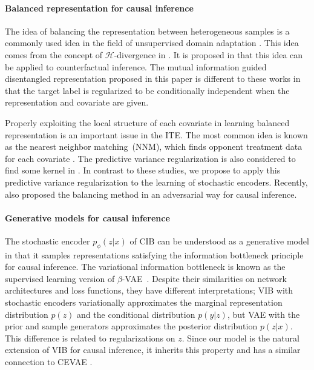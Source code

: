 \documentclass{article}
\begin{document}
\paragraph{Balanced representation for causal inference}

The idea of balancing the representation between heterogeneous samples is a commonly used idea in the field of unsupervised domain adaptation \cite{UDA15, tzeng2017adversarial, hoffman18}. This idea comes from the concept of $ \mathcal{H}$-divergence in \cite{ben2010theory}. It is proposed in \cite{johansson16, Shalit17} that this idea can be applied to counterfactual inference. The mutual information guided disentangled representation proposed in this paper is different to these works in that the target label is regularized to be conditionally independent when the representation and covariate are given.
    
Properly exploiting the local structure of each covariate in learning balanced representation is an important issue in the ITE. The most common idea is known as the nearest neighbor matching~(NNM), which finds opponent treatment data for each covariate \cite{johansson16,li2017matching,yao2018}. The predictive variance regularization is also considered to find some kernel in \cite{Alaa17,jean2018semi}. In contrast to these studies, we propose to apply this predictive variance regularization to the learning of stochastic encoders. Recently, \cite{du2019adversarial} also proposed the  balancing method in an adversarial way for causal inference.
    
    


\paragraph{Generative models for causal inference}



    The stochastic encoder $ p_{\phi} (z | x) $ of CIB can be understood as a generative model in that it samples representations satisfying the information bottleneck principle for causal inference. The variational information bottleneck \cite{Alemi17} is known as the supervised learning version of $\beta$-VAE~\cite{Higgins17}. Despite their similarities on network architectures and loss functions, they have different interpretations; VIB with stochastic encoders variationally approximates the marginal representation distribution $ p (z) $ and the conditional distribution $ p (y | z) $, but VAE with the prior and sample generators approximates the posterior distribution $ p (z | x)$. This difference is related to regularizations on $z$. Since our model is the natural extension of VIB for causal inference, it inherits this property and has a similar connection to CEVAE \cite{Louizos17}. 
\end{document}
